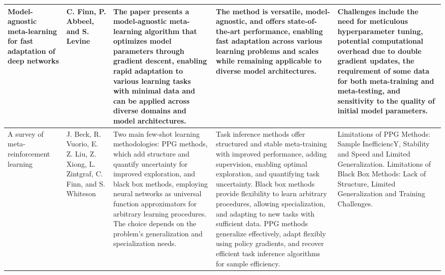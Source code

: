 \documentclass[conference]{IEEEtran}
\begin{document}
\begin{table}
\begin{center}
\begin{tabular}{ |p{2cm}|p{2cm}|p{4cm}|p{3cm}|p{4cm}| }
\hline
[36] Model-agnostic meta-learning for fast adaptation of deep networks & C. Finn, P. Abbeel, and S. Levine & The paper presents a model-agnostic meta-learning algorithm that optimizes model parameters through gradient descent, enabling rapid adaptation to various learning tasks with minimal data and can be applied across diverse domains and model architectures. & The method is versatile, model-agnostic, and offers state-of-the-art performance, enabling fast adaptation across various learning problems and scales while remaining applicable to diverse model architectures. & Challenges include the need for meticulous hyperparameter tuning, potential computational overhead due to double gradient updates, the requirement of some data for both meta-training and meta-testing, and sensitivity to the quality of initial model parameters. \\
\hline
[37] A survey of meta-reinforcement learning & J. Beck, R. Vuorio, E. Z. Liu, Z. Xiong, L. Zintgraf, C. Finn, and S. Whiteson & Two main few-shot learning methodologies: PPG methods, which add structure and quantify uncertainty for improved exploration, and black box methods, employing neural networks as universal function approximators for arbitrary learning procedures. The choice depends on the problem's generalization and specialization needs. & Task inference methods offer structured and stable meta-training with improved performance, adding supervision, enabling optimal exploration, and quantifying task uncertainty. Black box methods provide flexibility to learn arbitrary procedures, allowing specialization, and adapting to new tasks with sufficient data. PPG methods generalize effectively, adapt flexibly using policy gradients, and recover efficient task inference algorithms for sample efficiency. & Limitations of PPG Methods: Sample InefficiencY, Stability and Speed and Limited Generalization.
Limitations of Black Box Methods: Lack of Structure, Limited Generalization and Training Challenges. \\
\hline

\end{tabular}
\end{center}
\end{table}
\end{document}
